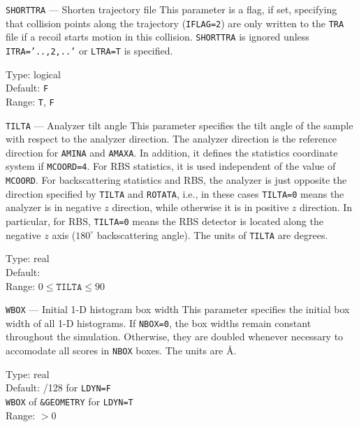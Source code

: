 \begin{keydescription}{\texttt{SHORTTRA} --- Shorten trajectory file}
%
  This parameter is a flag, if set, specifying that collision points
  along the trajectory (\texttt{IFLAG=2}) are only written to the \texttt{TRA}
  file if a recoil starts motion in this collision. \texttt{SHORTTRA} is ignored
  unless \texttt{ITRA='..,2,..'} or \texttt{LTRA=T} is specified.
  \begin{keytab}
    Type:    \> logical \\
    Default: \> \texttt{F} \\
    Range:   \> \texttt{T}, \texttt{F}
  \end{keytab}
\end{keydescription}

\begin{keydescription}{\texttt{TILTA} --- Analyzer tilt angle}
%
  This parameter specifies the tilt angle of the sample with respect to the
  analyzer direction. The analyzer direction is the reference direction for
  \texttt{AMINA} and \texttt{AMAXA}. In addition, it defines the statistics
  coordinate system if \texttt{MCOORD=4}. For RBS statistics, it is used
  independent of the value of \texttt{MCOORD}. For backscattering statistics and
  RBS, the analyzer is just opposite the direction specified by \texttt{TILTA}
  and \texttt{ROTATA}, i.e., in these cases \texttt{TILTA=0} means the analyzer
  is in negative $z$ direction, while otherwise it is in positive $z$ direction.
  In particular, for RBS, \texttt{TILTA=0} means the RBS detector is
  located along the negative $z$ axis ($180^\circ$ backscattering angle). The
  units of \texttt{TILTA} are degrees.
  \begin{keytab}
    Type:    \> real \\
    Default:  \\
    Range:   \> $0 \le \texttt{TILTA} \le 90$
  \end{keytab}
\end{keydescription}

\begin{keydescription}{\texttt{WBOX} --- Initial 1-D histogram box width}
%
  This parameter specifies the initial box width of all 1-D histograms. If
  \texttt{NBOX=0}, the box widths remain constant throughout the simulation.
  Otherwise, they are doubled whenever necessary to accomodate all scores in
  \texttt{NBOX} boxes. The units are \AA.  
  \begin{keytab}
    Type:    \> real \\
    Default: /128 for \texttt{LDYN=F} \\
             \> \texttt{WBOX} of \texttt{\&GEOMETRY} for \texttt{LDYN=T} \\
    Range:   \> $> 0$
  \end{keytab}
\end{keydescription}

